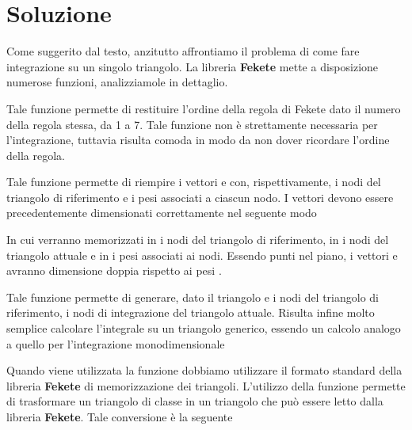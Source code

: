\newpage

\section*{Soluzione}

Come suggerito dal testo, anzitutto affrontiamo il problema di come fare integrazione su un singolo triangolo. La libreria \textbf{Fekete} mette a disposizione numerose funzioni, analizziamole in dettaglio.

\lstset{basicstyle=\scriptsize\sf}

\lstset{basicstyle=\sf}

Tale funzione permette di restituire l'ordine della regola di Fekete dato il numero della regola stessa, da 1 a 7. Tale funzione non \`e strettamente necessaria per l'integrazione, tuttavia risulta comoda in modo da non dover ricordare l'ordine della regola.

\lstset{basicstyle=\scriptsize\sf}

\lstset{basicstyle=\sf}

Tale funzione permette di riempire i vettori  e  con, rispettivamente, i nodi del triangolo di riferimento e i pesi associati a ciascun nodo. I vettori devono essere precedentemente dimensionati correttamente nel seguente modo

\lstset{basicstyle=\scriptsize\sf}

\lstset{basicstyle=\sf}

In cui verranno memorizzati in  i nodi del triangolo di riferimento, in  i nodi del triangolo attuale e in  i pesi associati ai nodi. Essendo punti nel piano, i vettori  e  avranno dimensione doppia rispetto ai pesi .

\lstset{basicstyle=\scriptsize\sf}

\lstset{basicstyle=\sf}

Tale funzione permette di generare, dato il triangolo e i nodi del triangolo di riferimento, i nodi di integrazione del triangolo attuale. Risulta infine molto semplice calcolare l'integrale su un triangolo generico, essendo un calcolo analogo a quello per l'integrazione monodimensionale

\lstset{basicstyle=\scriptsize\sf}

\lstset{basicstyle=\sf}

Quando viene utilizzata la funzione  dobbiamo utilizzare il formato standard della libreria \textbf{Fekete} di memorizzazione dei triangoli. L'utilizzo della funzione  permette di trasformare un triangolo di classe  in un triangolo che pu\`o essere letto dalla libreria \textbf{Fekete}. Tale conversione \`e la seguente

